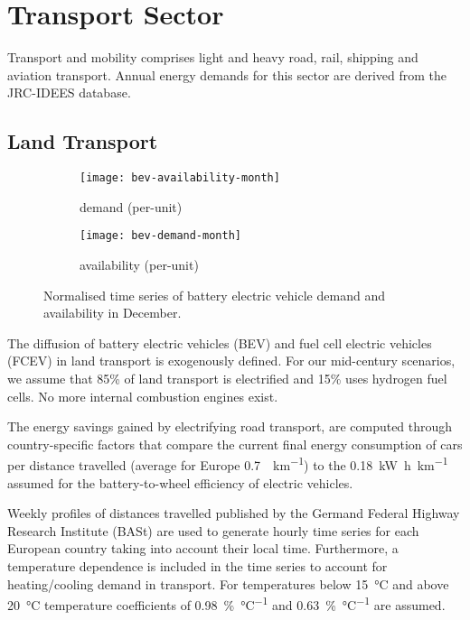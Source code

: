 \section{Transport Sector}
\label{sec:si:transport}

Transport and mobility comprises light and heavy road, rail, shipping and
aviation transport. Annual energy demands for this sector are derived from the
JRC-IDEES database.

\subsection{Land Transport}
\label{sec:si:transport:land}

\begin{figure}
    \centering
    \begin{subfigure}[t]{\textwidth}
        \centering
        \caption{demand (per-unit)}
        \texttt{[image: bev-availability-month]}
    \end{subfigure}
    \vspace{-0.5cm}
    \begin{subfigure}[t]{\textwidth}
        \centering
        \caption{availability (per-unit)}
        \texttt{[image: bev-demand-month]}
    \end{subfigure}
    \caption{Normalised time series of battery electric vehicle demand and availability in December.}
    \label{fig:bev-demand-availability}
\end{figure}

The diffusion of battery electric vehicles (BEV) and fuel cell electric vehicles
(FCEV) in land transport is exogenously defined. For our mid-century scenarios,
we assume that 85\% of land transport is electrified and 15\% uses hydrogen fuel
cells. No more internal combustion engines exist.

The energy savings gained by electrifying road transport, are computed through
country-specific factors that compare the current final energy consumption of
cars per distance travelled (average for Europe
\SI{0.7}{\kwh\per\kilo\metre}) to the
\SI{0.18}{\kilo\watt\hour\per\kilo\metre} assumed for the battery-to-wheel
efficiency of electric vehicles.

Weekly profiles of distances travelled published by the Germand Federal Highway
Research Institute (BASt) are used to generate hourly time series for
each European country taking into account their local time. Furthermore, a
temperature dependence is included in the time series to account for
heating/cooling demand in transport. For temperatures below \SI{15}{\celsius}
and above \SI{20}{\celsius} temperature coefficients of
\SI{0.98}{\percent\per\celsius} and \SI{0.63}{\percent\per\celsius} are assumed.

